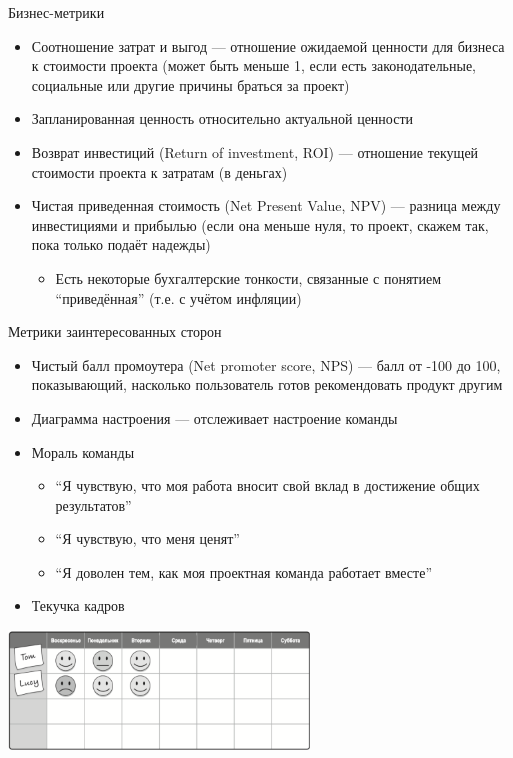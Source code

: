 \documentclass{../../slides-style}
\begin{document}
    \begin{frame}{Бизнес-метрики}
        \begin{itemize}
            \item Соотношение затрат и выгод --- отношение ожидаемой ценности для бизнеса к стоимости проекта (может быть меньше 1, если есть законодательные, социальные или другие причины браться за проект)
            \item Запланированная ценность относительно актуальной ценности
            \item Возврат инвестиций (Return of investment, ROI) --- отношение текущей стоимости проекта к затратам (в деньгах)
            \item Чистая приведенная стоимость (Net Present Value, NPV) --- разница между инвестициями и прибылью (если она меньше нуля, то проект, скажем так, пока только подаёт надежды)
            \begin{itemize}
                \item Есть некоторые бухгалтерские тонкости, связанные с понятием \enquote{приведённая} (т.е. с учётом инфляции)
            \end{itemize}
        \end{itemize}
    \end{frame}

    \begin{frame}{Метрики заинтересованных сторон}
        \begin{itemize}
            \item Чистый балл промоутера (Net promoter score, NPS) --- балл от -100 до 100, показывающий, насколько пользователь готов рекомендовать продукт другим
            \item Диаграмма настроения --- отслеживает настроение команды
            \item Мораль команды
            \begin{itemize}
                \item \enquote{Я чувствую, что моя работа вносит свой вклад в достижение общих результатов}
                \item \enquote{Я чувствую, что меня ценят}
                \item \enquote{Я доволен тем, как моя проектная команда работает вместе}
            \end{itemize}
            \item Текучка кадров
        \end{itemize}
        \begin{center}
            \includegraphics[width=0.6\textwidth]{moodChart.png}
        \end{center}
    \end{frame}
\end{document}

